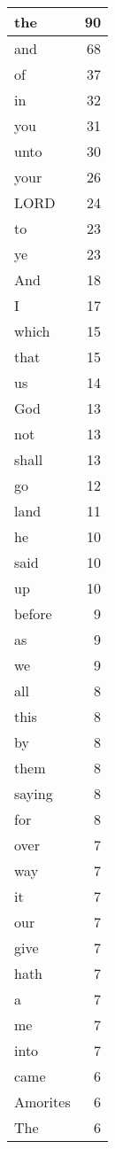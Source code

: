 \begin{center}
\begin{longtable}{l|r}
\hline \hline
\endlastfoot
the & 90 \\ \hline
and & 68 \\ \hline
of & 37 \\ \hline
in & 32 \\ \hline
you & 31 \\ \hline
unto & 30 \\ \hline
your & 26 \\ \hline
LORD & 24 \\ \hline
to & 23 \\ \hline
ye & 23 \\ \hline
And & 18 \\ \hline
I & 17 \\ \hline
which & 15 \\ \hline
that & 15 \\ \hline
us & 14 \\ \hline
God & 13 \\ \hline
not & 13 \\ \hline
shall & 13 \\ \hline
go & 12 \\ \hline
land & 11 \\ \hline
he & 10 \\ \hline
said & 10 \\ \hline
up & 10 \\ \hline
before & 9 \\ \hline
as & 9 \\ \hline
we & 9 \\ \hline
all & 8 \\ \hline
this & 8 \\ \hline
by & 8 \\ \hline
them & 8 \\ \hline
saying & 8 \\ \hline
for & 8 \\ \hline
over & 7 \\ \hline
way & 7 \\ \hline
it & 7 \\ \hline
our & 7 \\ \hline
give & 7 \\ \hline
hath & 7 \\ \hline
a & 7 \\ \hline
me & 7 \\ \hline
into & 7 \\ \hline
came & 6 \\ \hline
Amorites & 6 \\ \hline
The & 6 \\ \hline

\end{longtable}
\end{center}
